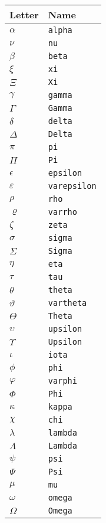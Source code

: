 \documentclass[12pt]{article}
\begin{document}
\begin{tabular}{ll}
    \toprule
    Letter & Name\\
    \midrule
    $\alpha$      & \verb|alpha|\\
    $\nu$         & \verb|nu|\\
    $\beta$       & \verb|beta|\\
    $\xi$         & \verb|xi|\\
    $\Xi$         & \verb|Xi|\\
    $\gamma$      & \verb|gamma|\\
    $\Gamma$      & \verb|Gamma|\\
    $\delta$      & \verb|delta|\\
    $\Delta$      & \verb|Delta|\\
    $\pi$         & \verb|pi|\\
    $\Pi$         & \verb|Pi|\\
    $\epsilon$    & \verb|epsilon|\\
    $\varepsilon$ & \verb|varepsilon|\\
    $\rho$        & \verb|rho|\\
    $\varrho$     & \verb|varrho|\\
    $\zeta$       & \verb|zeta|\\
    $\sigma$      & \verb|sigma|\\
    $\Sigma$      & \verb|Sigma|\\
    $\eta$        & \verb|eta|\\
    $\tau$        & \verb|tau|\\
    $\theta$      & \verb|theta|\\
    $\vartheta$   & \verb|vartheta|\\
    $\Theta$      & \verb|Theta|\\
    $\upsilon$    & \verb|upsilon|\\
    $\Upsilon$    & \verb|Upsilon|\\
    $\iota$       & \verb|iota|\\
    $\phi$        & \verb|phi|\\
    $\varphi$     & \verb|varphi|\\
    $\Phi$        & \verb|Phi|\\
    $\kappa$      & \verb|kappa|\\
    $\chi$        & \verb|chi|\\
    $\lambda$     & \verb|lambda|\\
    $\Lambda$     & \verb|Lambda|\\
    $\psi$        & \verb|psi|\\
    $\Psi$        & \verb|Psi|\\
    $\mu$         & \verb|mu|\\
    $\omega$      & \verb|omega|\\
    $\Omega$      & \verb|Omega|\\
    \bottomrule
\end{tabular}
\end{document}
